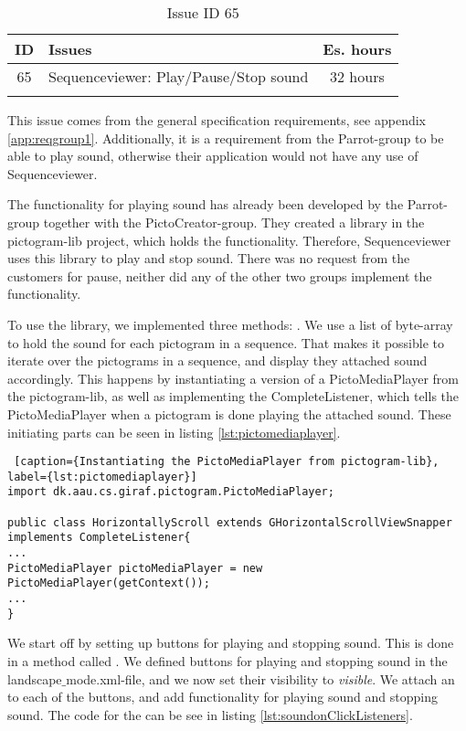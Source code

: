\begin{longtable} { | c | p{12cm} | c | } 
\hline
	ID 	&	Issues	&		 Es. hours \\\hline
	 65	&	Sequenceviewer: Play/Pause/Stop sound	&	32 hours \\\hline
\caption{Issue ID 65}
\label{tab:spr4_SVplaypausestopsound}
\end{longtable}

This issue comes from the general specification requirements, see appendix \ref{app:reqgroup1}. Additionally, it is a requirement from the Parrot-group to be able to play sound, otherwise their application would not have any use of Sequenceviewer.

The functionality for playing sound has already been developed by the Parrot-group together with the PictoCreator-group. They created a library in the pictogram-lib project, which holds the functionality. Therefore, Sequenceviewer uses this library to play and stop sound. There was no request from the customers for pause, neither did any of the other two groups implement the functionality.

To use the library, we implemented three methods: . We use a list of byte-array to hold the sound for each pictogram in a sequence. That makes it possible to iterate over the pictograms in a sequence, and display they attached sound accordingly. This happens by instantiating a version of a PictoMediaPlayer from the pictogram-lib, as well as implementing the CompleteListener, which tells the PictoMediaPlayer when a pictogram is done playing the attached sound. These initiating parts can be seen in listing \ref{lst:pictomediaplayer}.

\begin{lstlisting} [caption={Instantiating the PictoMediaPlayer from pictogram-lib}, label={lst:pictomediaplayer}]
import dk.aau.cs.giraf.pictogram.PictoMediaPlayer;

public class HorizontallyScroll extends GHorizontalScrollViewSnapper implements CompleteListener{
...
PictoMediaPlayer pictoMediaPlayer = new PictoMediaPlayer(getContext());
...
}
\end{lstlisting}

We start off by setting up buttons for playing and stopping sound. This is done in a method called . We defined buttons for playing and stopping sound in the landscape$\_$mode.xml-file, and we now set their visibility to \textit{visible}. We attach an  to each of the buttons, and add functionality for playing sound and stopping sound. The code for the  can be see in listing \ref{lst:soundonClickListeners}.

